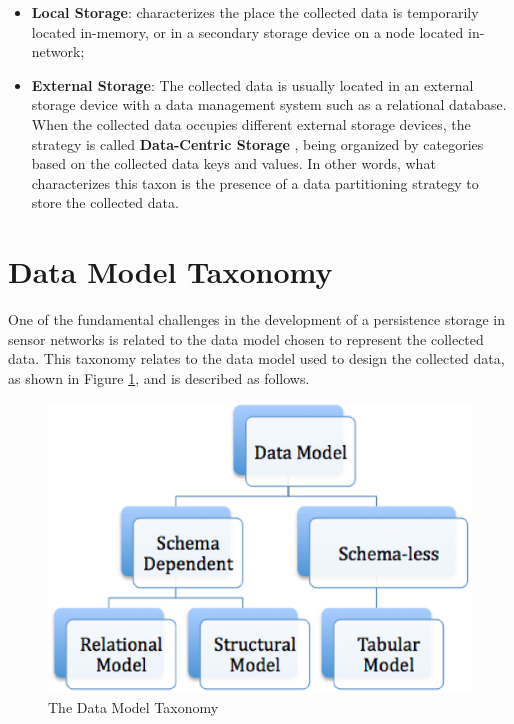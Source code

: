 \begin{itemize}
  \item \textbf{Local Storage}: characterizes the place the collected data is
  temporarily located in-memory, or in a secondary storage device on a node
  located in-network;
  \item \textbf{External Storage}: The collected data is usually located in an
  external storage device with a data management system such as a relational
  database. When the collected data occupies different external storage devices, the
  strategy is called \textbf{Data-Centric Storage}
  \cite{sn-data-centric-storage}, being organized by categories based on the
  collected data keys and values. In other words, what characterizes this
  taxon is the presence of a data partitioning strategy to store the collected
  data.
\end{itemize}

\section{Data Model Taxonomy}

One of the fundamental challenges in the development of a persistence storage
in sensor networks is related to the data model chosen to represent the
collected data. This taxonomy relates to the data model used to design the 
collected data, as shown in Figure \ref{fig:taxonomy-data-model}, and is 
described as follows.

\begin{figure}[h]
  \centering
  \includegraphics[scale=0.5]{../diagrams/taxonomy-data-model}
  \caption{The Data Model Taxonomy}
  \label{fig:taxonomy-data-model}
\end{figure}

